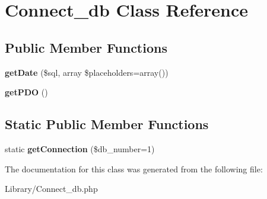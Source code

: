 \hypertarget{class_connect__db}{\section{Connect\-\_\-db Class Reference}
\label{class_connect__db}
}
\subsection*{Public Member Functions}
\begin{DoxyCompactItemize}
\item 
\hypertarget{class_connect__db_a064a8657e9547cedc4e1590fb8c7747f}{{\bfseries get\-Date} (\$sql, array \$placeholders=array())}\label{class_connect__db_a064a8657e9547cedc4e1590fb8c7747f}

\item 
\hypertarget{class_connect__db_af708fa20ff0c04a5a9bd8badd63e632c}{{\bfseries get\-P\-D\-O} ()}\label{class_connect__db_af708fa20ff0c04a5a9bd8badd63e632c}

\end{DoxyCompactItemize}
\subsection*{Static Public Member Functions}
\begin{DoxyCompactItemize}
\item 
\hypertarget{class_connect__db_ab6bc68b89cd8ca077dd8ab2c5a357f06}{static {\bfseries get\-Connection} (\$db\-\_\-number=1)}\label{class_connect__db_ab6bc68b89cd8ca077dd8ab2c5a357f06}

\end{DoxyCompactItemize}


The documentation for this class was generated from the following file\-:\begin{DoxyCompactItemize}
\item 
Library/Connect\-\_\-db.\-php\end{DoxyCompactItemize}
